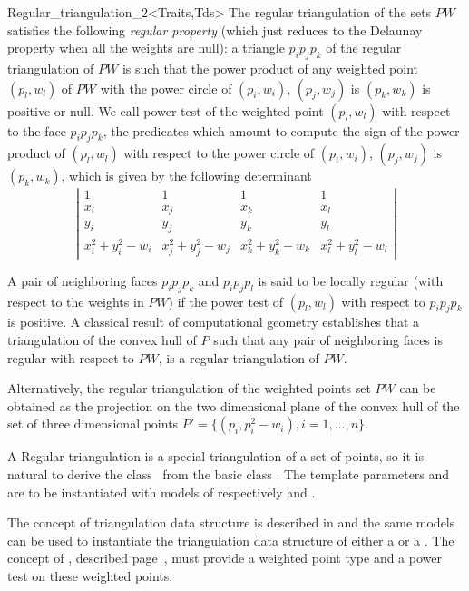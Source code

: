 \begin{ccRefClass}{Regular_triangulation_2<Traits,Tds>}
The regular triangulation of the sets ${  PW}$
satisfies the following {\em regular property} (which just reduces to the 
Delaunay property when all the weights are null):
a triangle $p_ip_jp_k$ of the regular triangulation
of ${  PW}$ is such that the power product of any weighted point
 $(p_l, w_l)$ of ${  PW}$ with the power circle of
 $(p_i, w_i)$, $(p_j, w_j)$ is $(p_k, w_k)$ is positive or null.
We call  power test of the weighted point $(p_l, w_l)$ with respect
to the face  $p_ip_jp_k$, the predicates which amount to compute
the sign of 
the power product of $(p_l, w_l)$ with respect to
the power circle of
 $(p_i, w_i)$, $(p_j, w_j)$ is $(p_k, w_k)$,
which is given by the following
determinant
\[\left| \begin{array}{cccc}
1    & 1                       & 1                       & 1 \\
x_i & x_j & x_k & x_l \\
y_i & y_j & y_k & y_l \\
x_i ^2 + y_i ^2 -w_i & x_j ^2 + y_j ^2 - w_j & x_k ^2 + y_k ^2 - w_k &
x_l ^2 + y_l ^2 -w_l  
\end{array}
\right|
\]

A pair of neighboring faces $p_ip_jp_k$
and $p_ip_jp_l$ is said to be locally regular
(with respect to  the weights in ${  PW}$)
if the power test of $(p_l,w_l)$ with respect to
$p_ip_jp_k$ is positive.
A classical  result of computational geometry
establishes that a triangulation of the convex hull of ${  P}$
such that any pair of neighboring faces is regular with respect
to ${  PW}$, is a
 regular triangulation of ${  PW}$.

Alternatively, the regular triangulation
of the weighted points set ${  PW}$
can be obtained as the projection
on the two dimensional plane of the convex hull of the set of three
dimensional points 
${  P'}= \{ (p_i,p_i ^2 - w_i ), i = 1, \ldots , n \}$.



 
A Regular triangulation is a special triangulation of a set of points,
so it is natural to derive  the class \ccRefName\
from the basic class .
The template parameters  and  
are to be instantiated with models of respectively
  and
.


The concept of triangulation data structure
is described in 
and the same models can be used to instantiate the
triangulation data structure of either a 
or a \ccRefName.
The  concept of ,
described page~, 
must provide a weighted point type
and a power test on these weighted points. 


\end{ccRefClass}
